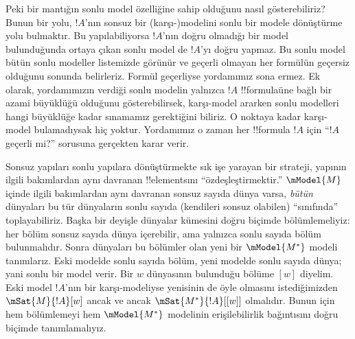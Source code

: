 Peki bir mantığın sonlu model özelliğine sahip olduğunu nasıl gösterebiliriz?
Bunun bir yolu, $!A$'nın sonsuz bir (karşı-)modelini sonlu bir modele
dönüştürme yolu bulmaktır. Bu yapılabiliyorsa $!A$'nın doğru olmadığı bir
model bulunduğunda ortaya çıkan sonlu model de $!A$'yı doğru yapmaz. Bu
sonlu model bütün sonlu modeller listemizde görünür ve geçerli olmayan her
formülün geçersiz olduğunu sonunda belirleriz. Formül geçerliyse yordamımız
sona ermez. Ek olarak, yordamımızın verdiği sonlu modelin yalnızca $!A$
!!{formula}{}üne bağlı bir azami büyüklüğü olduğunu gösterebilirsek,
karşı-model ararken sonlu modelleri hangi büyüklüğe kadar sınamamız
gerektiğini biliriz. O noktaya kadar karşı-model bulamadıysak hiç yoktur.
  Yordamımız o zaman her !!{formula} $!A$ için ``$!A$ geçerli mi?'' sorusuna
  gerçekten karar verir.

Sonsuz yapıları sonlu yapılara dönüştürmekte sık işe yarayan bir strateji,
yapının ilgili bakımlardan aynı davranan !!{element}s{}ını
``özdeşleştirmektir.'' $\mModel{M}$ içinde ilgili bakımlardan aynı davranan
sonsuz sayıda dünya varsa, \emph{bütün} dünyaları bu tür dünyaların sonlu
sayıda (kendileri sonsuz olabilen) ``sınıfında'' toplayabiliriz. Başka bir
deyişle dünyalar kümesini doğru biçimde bölümlemeliyiz: her bölüm sonsuz
sayıda dünya içerebilir, ama yalnızca sonlu sayıda bölüm bulunmalıdır. Sonra
dünyaları bu bölümler olan yeni bir $\mModel{M^*}$ modeli tanımlarız. Eski
modelde sonlu sayıda bölüm, yeni modelde sonlu sayıda dünya; yani sonlu bir
model verir. Bir $w$ dünyasının bulunduğu bölüme $[w]$ diyelim. Eski model
$!A$'nın bir karşı-modeliyse yenisinin de öyle olmasını istediğimizden
$\mSat{M}{!A}[w]$ ancak ve ancak $\mSat{M^*}{!A}[{[w]}]$ olmalıdır. Bunun
için hem bölümlemeyi hem $\mModel{M^*}$ modelinin erişilebilirlik bağıntısını
doğru biçimde tanımlamalıyız.

